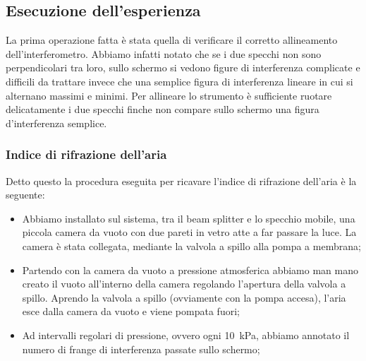 \subsection{Esecuzione dell'esperienza}

La prima operazione fatta è stata quella di verificare il corretto allineamento dell'interferometro. Abbiamo infatti notato che se i due specchi non sono perpendicolari tra loro, sullo schermo si vedono figure di interferenza complicate e difficili da trattare invece che una semplice figura di interferenza lineare in cui si alternano massimi e minimi. Per allineare lo strumento è sufficiente ruotare delicatamente i due specchi finche non compare sullo schermo una figura d'interferenza semplice.


\subsubsection{Indice di rifrazione dell'aria}

Detto questo la procedura eseguita per ricavare l'indice di rifrazione dell'aria è la seguente:
\begin{itemize}
	\item{Abbiamo installato sul sistema, tra il beam splitter e lo specchio mobile, una piccola camera da vuoto con due pareti in vetro atte a far passare la luce. La camera è stata collegata, mediante la valvola a spillo alla pompa a membrana;} %
    \item{Partendo con la camera da vuoto a pressione atmosferica abbiamo man mano creato il vuoto all'interno della camera regolando l'apertura della valvola a spillo. Aprendo la valvola a spillo (ovviamente con la pompa accesa), l'aria esce dalla camera da vuoto e viene pompata fuori;}
    \item{Ad intervalli regolari di pressione, ovvero ogni \SI{10}{\kilo\pascal}, abbiamo annotato il numero di frange di interferenza passate sullo schermo;}
\end{itemize}

